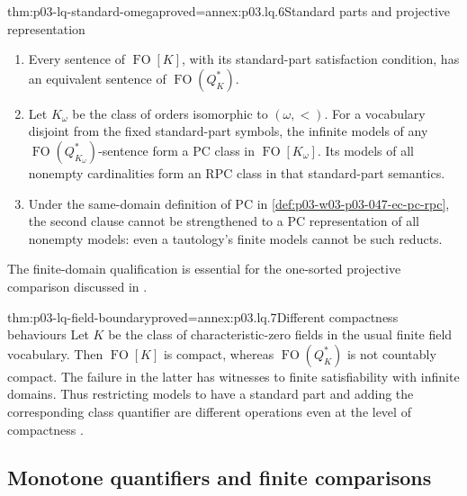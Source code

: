 \begin{hbtheorem}{thm:p03-lq-standard-omega}{proved=annex:p03.lq.6}{Standard parts and projective representation}
\begin{enumerate}
 \item Every sentence of \(\operatorname{FO}[K]\), with its
       standard-part satisfaction condition, has an equivalent
       sentence of \(\operatorname{FO}(Q_K^*)\).
 \item Let \(K_\omega\) be the class of orders isomorphic to
       \((\omega,<)\). For a vocabulary disjoint from the fixed
       standard-part symbols, the infinite models of any
       \(\operatorname{FO}(Q_{K_\omega}^*)\)-sentence form a PC
       class in \(\operatorname{FO}[K_\omega]\).
       Its models of all nonempty cardinalities form an RPC class
       in that standard-part semantics.
 \item Under the same-domain definition of PC in
       \cref{def:p03-w03-p03-047-ec-pc-rpc}, the second clause cannot
       be strengthened to a PC representation of all nonempty models:
       even a tautology's finite models cannot be such reducts.
\end{enumerate}
The finite-domain qualification is essential for the one-sorted
projective comparison discussed in
\cite[Ch.~II, \S4.1, p.~52]{Ebbinghaus1985ExtendedLogics}.
\end{hbtheorem}

\begin{hbtheorem}{thm:p03-lq-field-boundary}{proved=annex:p03.lq.7}{Different compactness behaviours}
Let \(K\) be the class of characteristic-zero fields in the usual
finite field vocabulary. Then \(\operatorname{FO}[K]\) is compact,
whereas \(\operatorname{FO}(Q_K^*)\) is not countably compact.
The failure in the latter has witnesses to finite satisfiability
with infinite domains. Thus restricting models to have a standard
part and adding the corresponding class quantifier are different
operations even at the level of compactness
\cite[Ch.~II, \S4.1, p.~52]{Ebbinghaus1985ExtendedLogics}.
\end{hbtheorem}

\subsection{Monotone quantifiers and finite comparisons}

